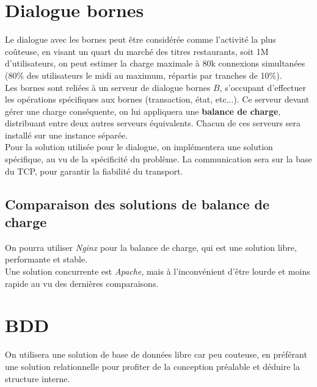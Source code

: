 




\section{Dialogue bornes}

Le dialogue avec les bornes peut être considérée comme l'activité la plus
coûteuse, en visant un quart du marché des titres restaurants, soit 1M
d'utilisateurs, on peut estimer la charge maximale à 80k connexions
simultanées (80\% des utilisateurs le midi au maximum, répartis par tranches de
10\%). \\

Les bornes sont reliées à un serveur de dialogue bornes $B$, s'occupant
d'effectuer les opérations spécifiques aux bornes (transaction, état, etc...).
Ce serveur devant gérer une charge conséquente, on lui appliquera une
\textbf{balance de charge}, distribuant entre deux autres serveurs équivalents.
Chacun de ces serveurs sera installé sur une instance séparée. \\

Pour la solution utilisée pour le dialogue, on implémentera une solution
spécifique, au vu de la spécificité du problème. La communication sera sur la
base du TCP, pour garantir la fiabilité du transport. \\

\subsection{Comparaison des solutions de balance de charge}

On pourra utiliser \textit{Nginx} pour la balance de charge, qui est une
solution libre, performante et stable. \\

Une solution concurrente est \textit{Apache}, mais à l'inconvénient d'être
lourde et moins rapide au vu des dernières comparaisons.

\section{BDD}

On utilisera une solution de base de données libre car peu couteuse, en
préférant une solution relationnelle pour profiter de la conception préalable
et déduire la structure interne. \\

